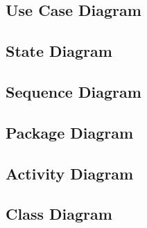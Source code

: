 \subsection{Use Case Diagram}

\subsection{State Diagram}

\subsection{Sequence Diagram}

\subsection{Package Diagram}

\subsection{Activity Diagram}

\subsection{Class Diagram}
